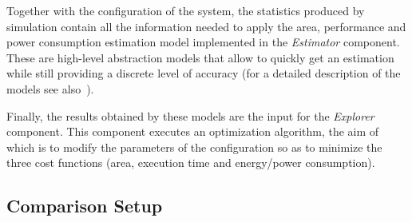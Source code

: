 Together with the configuration of the system, the statistics produced
by simulation contain all the information needed to apply the area,
performance and power consumption estimation model implemented in the
\emph{Estimator} component. These are high-level abstraction models
that allow to quickly get an estimation while still providing a
discrete level of accuracy (for a detailed description of the models
see also~\cite{Ascia2005940}).

Finally, the results obtained by these
models are the input for the \emph{Explorer} component. This component
executes an optimization algorithm, the aim of which is to modify the
parameters of the configuration so as to minimize the three cost
functions (area, execution time and energy/power consumption).

%

\subsection{Comparison Setup}

